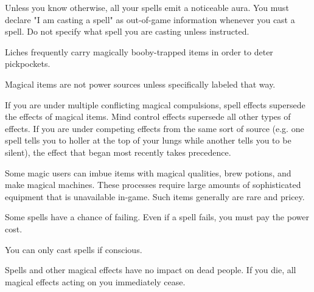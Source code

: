 \documentclass[green]{Sel}
\begin{document}
\name{\gMagic{}}
Unless you know otherwise, all your spells emit a noticeable aura. You must declare "I am casting a spell" as out-of-game information whenever you cast a spell. Do not specify what spell you are casting unless instructed.

Liches frequently carry magically booby-trapped items in order to deter pickpockets.

Magical items are not power sources unless specifically labeled that way.

If you are under multiple conflicting magical compulsions, spell effects supersede the effects of magical items. Mind control effects supersede all other types of effects. If you are under competing effects from the same sort of source (e.g. one spell tells you to holler at the top of your lungs while another tells you to be silent), the effect that began most recently takes precedence.

Some magic users can imbue items with magical qualities, brew potions, and make magical machines. These processes require large amounts of sophisticated equipment that is unavailable in-game. Such items generally are rare and pricey.

Some spells have a chance of failing. Even if a spell fails, you must pay the power cost.

You can only cast spells if conscious.

Spells and other magical effects have no impact on dead people. If you die, all magical effects acting on you immediately cease.
\end{document}
